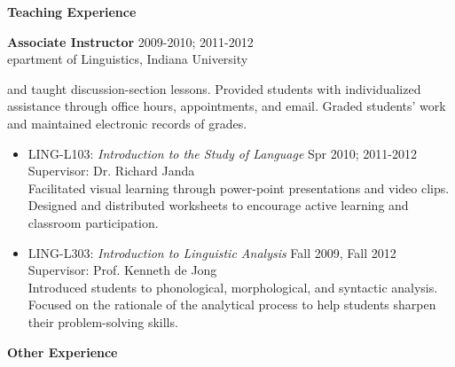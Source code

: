 \begin{singlespace}
\begin{itemize}
\begin{description}
\end{description}
\end{itemize}
\newpage
\thispagestyle{empty}
\centerline{\textbf{ Teaching Experience}}
\vspace{12pt}
\noindent\textbf{Associate Instructor} \hfill 2009-2010; 2011-2012 \\
epartment of Linguistics, Indiana University

\vspace{6pt}
 and taught discussion-section lessons. Provided students with individualized assistance through office hours, appointments, and email. Graded students' work and maintained electronic records of grades.
\vspace{3pt}
\begin{itemize} \itemsep6pt
\item{LING-L103:} \textit{Introduction to the Study of Language} \hfill Spr 2010; 2011-2012 \\
Supervisor: Dr. Richard Janda \\
\noindent Facilitated visual learning through power-point presentations and video clips. Designed and distributed worksheets to encourage active learning and classroom participation.
\item LING-L303: \textit{Introduction to Linguistic Analysis}
\hfill Fall 2009, Fall 2012 \\
Supervisor: Prof. Kenneth de Jong \\
Introduced students to phonological, morphological, and syntactic analysis. Focused on the rationale of the analytical process to help students sharpen their problem-solving skills.
\end{itemize}
\vspace{20pt}
\centerline{\textbf{ Other Experience}}

\end{singlespace}

